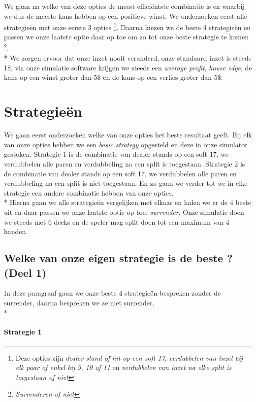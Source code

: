 \documentclass[conference]{IEEEtran}
\begin{document}
We gaan na welke van deze opties de meest effici\"entste combinatie is en waarbij we dus de meeste kans hebben op een positieve winst.
We onderzoeken eerst alle strategie\"en met onze eerste 3 opties
	\footnote{ Deze opties zijn {\it dealer stand of hit op een soft 17}, {\it verdubbelen van inzet bij elk paar of enkel bij 9, 10 of 11} en {\it verdubbelen van inzet na elke split is toegestaan of niet}}. 
Daarna kiezen we de beste 4 strategie\"en en passen we onze laatste optie daar op toe om zo tot onze beste strategie te komen 
	\footnote{{\it Surrenderen of niet}}. \\*
We zorgen ervoor dat onze inzet nooit veranderd, onze standaard inzet is steeds 1\$, via onze simulatie software krijgen we steeds een \textit{average profit}, \textit{house edge}, de kans op een winst groter dan 5\$ en de kans op een verlies groter dan 5\$. 

\newpage

\section{Strategie\"en}
We gaan eerst onderzoeken welke van onze opties het beste resultaat geeft. Bij elk van onze opties hebben we een \textit{basic strategy}
opgesteld en deze in onze simulator gestoken. Strategie 1 is de combinatie van dealer stands op een soft 17, we verdubbelen alle paren en
verdubbeling na een split is toegestaan. Strategie 2 is de combinatie van dealer stands op een soft 17, we verdubbelen alle paren en
verdubbeling na een split is niet toegestaan. En zo gaan we verder tot we in elke strategie een andere combinatie hebben van onze opties.\\*
Hierna gaan we alle strategie\"en vergelijken met elkaar en halen we er de 4 beste uit en daar passen we onze laatste optie op toe, \textit{surrender}. Onze simulatie doen we steeds met 6 decks en de speler mag split doen tot een maximum van 4 handen.

\subsection{Welke van onze eigen strategie is de beste ? (Deel 1)}
In deze paragraaf gaan we onze beste 4 strategie\"en bespreken zonder de surrender, daarna bespreken we ze met surrender.\\*


\paragraph{Strategie 1}
\end{document}
